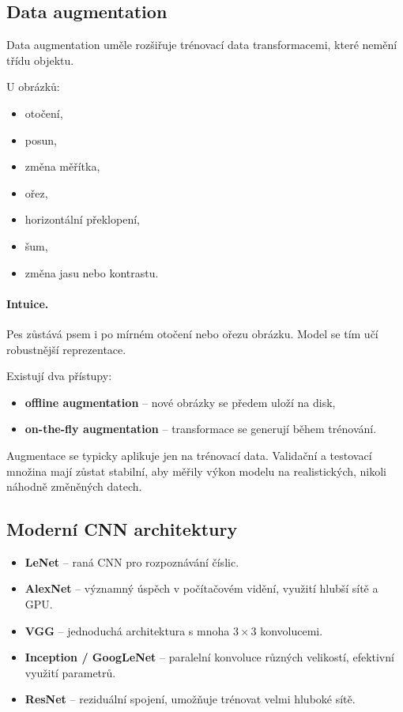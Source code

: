 \subsection{Data augmentation}

Data augmentation uměle rozšiřuje trénovací data transformacemi, které nemění třídu objektu.

U obrázků:
\begin{itemize}
    \item otočení,
    \item posun,
    \item změna měřítka,
    \item ořez,
    \item horizontální překlopení,
    \item šum,
    \item změna jasu nebo kontrastu.
\end{itemize}

\paragraph{Intuice.}
Pes zůstává psem i po mírném otočení nebo ořezu obrázku. Model se tím učí robustnější reprezentace.

Existují dva přístupy:
\begin{itemize}
    \item \textbf{offline augmentation} -- nové obrázky se předem uloží na disk,
    \item \textbf{on-the-fly augmentation} -- transformace se generují během trénování.
\end{itemize}

Augmentace se typicky aplikuje jen na trénovací data. Validační a testovací množina mají zůstat stabilní,
aby měřily výkon modelu na realistických, nikoli náhodně změněných datech.

\subsection{Moderní CNN architektury}

\begin{itemize}
    \item \textbf{LeNet} -- raná CNN pro rozpoznávání číslic.
    \item \textbf{AlexNet} -- významný úspěch v počítačovém vidění, využití hlubší sítě a GPU.
    \item \textbf{VGG} -- jednoduchá architektura s mnoha $3\times 3$ konvolucemi.
    \item \textbf{Inception / GoogLeNet} -- paralelní konvoluce různých velikostí, efektivní využití parametrů.
    \item \textbf{ResNet} -- reziduální spojení, umožňuje trénovat velmi hluboké sítě.
\end{itemize}

